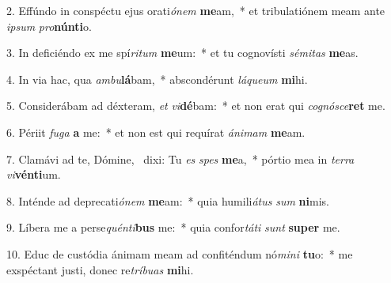 2. Effúndo in conspéctu ejus orati\textit{ó}\textit{nem} \textbf{me}am,~*  et tribulatiónem meam ante \textit{ip}\textit{sum} \textit{pro}\textbf{nún}\textbf{ti}o.\

3. In deficiéndo ex me spí\textit{ri}\textit{tum} \textbf{me}um:~*  et tu cognovísti \textit{sé}\textit{mi}\textit{tas} \textbf{me}as.\

4. In via hac, qua \textit{am}\textit{bu}\textbf{lá}bam,~*  abscondérunt \textit{lá}\textit{que}\textit{um} \textbf{mi}hi.\

5. Considerábam ad déxteram, \textit{et} \textit{vi}\textbf{dé}bam:~*  et non erat qui \textit{co}\textit{gnó}\textit{sce}\textbf{ret} me.\

6. Périit \textit{fu}\textit{ga} \textbf{a} me:~*  et non est qui requírat \textit{á}\textit{ni}\textit{mam} \textbf{me}am.\

7. Clamávi ad te, Dómine, \dag\  dixi: Tu \textit{es} \textit{spes} \textbf{me}a,~*  pórtio mea in \textit{ter}\textit{ra} \textit{vi}\textbf{vén}\textbf{ti}um.\

8. Inténde ad deprecati\textit{ó}\textit{nem} \textbf{me}am:~*  quia humili\textit{á}\textit{tus} \textit{sum} \textbf{ni}mis.\

9. Líbera me a perse\textit{quén}\textit{ti}\textbf{bus} me:~*  quia confor\textit{tá}\textit{ti} \textit{sunt} \textbf{su}\textbf{per} me.\

10. Educ de custódia ánimam meam ad confiténdum nó\textit{mi}\textit{ni} \textbf{tu}o:~*  me exspéctant justi, donec re\textit{trí}\textit{bu}\textit{as} \textbf{mi}hi.\

